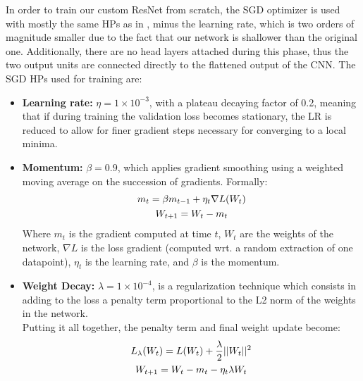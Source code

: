 \noindent
In order to train our custom ResNet from scratch, the SGD optimizer is used with mostly the same HPs as in \cite{resnet2016}, minus the learning rate, which is two orders of magnitude smaller due to the fact that our network is shallower than the original one. 
Additionally, there are no head layers attached during this phase, thus the two output units are connected directly to the flattened output of the CNN.
The SGD HPs used for training are:
\begin{itemize}
    \item \textbf{Learning rate:} $\eta =1\times 10^{-3}$, with a plateau decaying factor of 0.2, meaning that if during training the validation loss becomes stationary, the LR is reduced to allow for finer gradient steps necessary for converging to a local minima.
    \item \textbf{Momentum:} $\beta = 0.9$, which applies gradient smoothing using a weighted moving average on the succession of gradients. Formally:
    \begin{equation*}
    \centering
        \begin{gathered}
        m_t = \beta m_{t-1} + \eta_t\nabla L(W_t)  \\
        W_{t+1} = W_t - m_t\\
        \end{gathered}
    \end{equation*}
    Where $m_t$ is the gradient computed at time $t$, $W_t$ are the weights of the network, $\nabla L$ is the loss gradient (computed wrt. a random extraction of one datapoint), $\eta_t$ is the learning rate, and $\beta$ is the momentum.
    \item \textbf{Weight Decay:} $\lambda =1\times10^{-4}$, is a regularization technique which consists in adding to the loss a penalty term proportional to the L2 norm of the weights in the network.\\
    Putting it all together, the penalty term and final weight update become:
    \begin{equation*}
    \centering
        \begin{gathered}
        L_{\lambda}(W_t) = L(W_t) + \frac{\lambda}{2}||W_t||^2  \\
        W_{t+1} = W_t - m_t - \eta_t\lambda W_t\\
        \end{gathered}
    \end{equation*}
     
\end{itemize}

